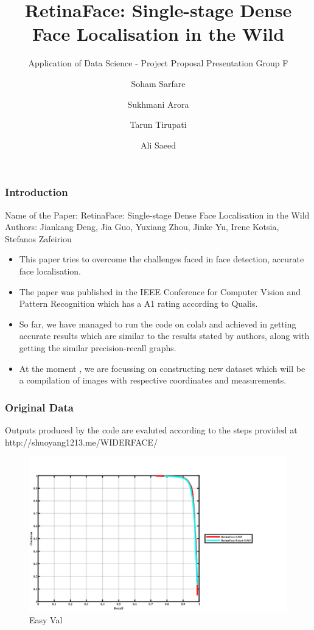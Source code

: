 \documentclass[11pt]{beamer}
\begin{document}
	\author[Soham, Sukhmani, Tarun, Ali]{Soham Sarfare \and Sukhmani Arora \and Tarun Tirupati \and Ali Saeed}
	\title[First Order Model]{ RetinaFace: Single-stage Dense Face Localisation in the Wild}
	\subtitle{Application of Data Science - Project Proposal Presentation Group F}
	\begin{frame}[plain]
		\maketitle
	\end{frame}
	\begin{frame}
		\frametitle{Introduction}
		Name of the Paper: RetinaFace: Single-stage Dense Face Localisation in the Wild\\
		Authors: Jiankang Deng, Jia Guo, Yuxiang Zhou, Jinke Yu, Irene Kotsia, Stefanos Zafeiriou
		\begin{itemize}
			\item This paper tries to overcome the challenges faced in face detection, accurate face localisation.
			\item The paper was published in the IEEE Conference for Computer Vision and Pattern Recognition which has a A1 rating according to Qualis. 
			\item So far, we have managed to run the code on colab and achieved in getting accurate results which are similar to the results stated by authors, along with getting the similar precision-recall graphs.
			\item At the moment , we are focussing on constructing new dataset which will be a compilation of images with respective coordinates and measurements.
			
		\end{itemize}
	\end{frame}
\begin{frame}
	\frametitle{Original Data}
	Outputs produced by the code are evaluted according to the steps provided at http://shuoyang1213.me/WIDERFACE/
	\begin{figure}
\includegraphics[width=0.75\linewidth]{wider_pr_cruve_int_easy_val.png}
	\caption{Easy Val}
	\end{figure}
	
\end{frame}
\end{document}
